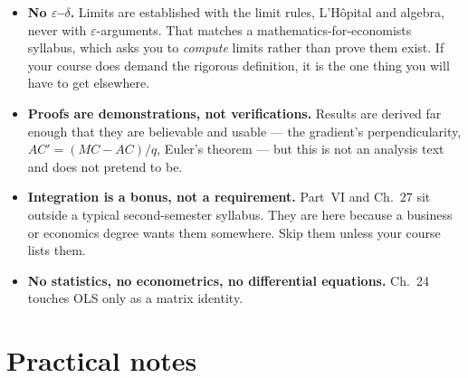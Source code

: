\begin{itemize}[leftmargin=1.6em,itemsep=0.4ex]
  \item \textbf{No $\varepsilon$--$\delta$.} Limits are established with the
        limit rules, L'H\^opital and algebra, never with
        $\varepsilon$-arguments. That matches a mathematics-for-economists
        syllabus, which asks you to \emph{compute} limits rather than prove
        them exist. If your course does demand the rigorous definition, it
        is the one thing you will have to get elsewhere.
  \item \textbf{Proofs are demonstrations, not verifications.} Results are
        derived far enough that they are believable and usable --- the
        gradient's perpendicularity, $AC'=(MC-AC)/q$, Euler's theorem --- but
        this is not an analysis text and does not pretend to be.
  \item \textbf{Integration is a bonus, not a requirement.} Part~VI and
        Ch.~27 sit outside a typical second-semester syllabus. They are here
        because a business or economics degree wants them somewhere. Skip
        them unless your course lists them.
  \item \textbf{No statistics, no econometrics, no differential equations.}
        Ch.~24 touches OLS only as a matrix identity.
\end{itemize}

\section*{Practical notes}

